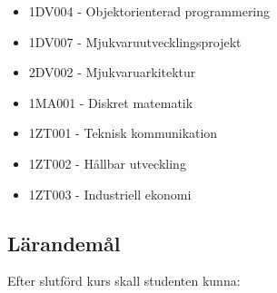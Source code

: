\begin{itemize}
\tightlist
\item
  1DV004 - Objektorienterad programmering
\item
  1DV007 - Mjukvaruutvecklingsprojekt
\item
  2DV002 - Mjukvaruarkitektur
\item
  1MA001 - Diskret matematik
\item
  1ZT001 - Teknisk kommunikation
\item
  1ZT002 - Hållbar utveckling
\item
  1ZT003 - Industriell ekonomi
\end{itemize}

\subsection*{Lärandemål}

Efter slutförd kurs skall studenten kunna:


